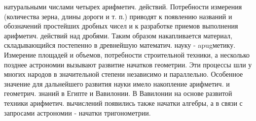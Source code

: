 \documentclass[10pt]{article}
\begin{document}
натуральными числами четырех арифметич. действий. Потребности измерения (количества зерна, длины дороги и т. п.) приводят к появлению названий и обозначений простейших дробных чисел и к разработке приемов выполнения арифметич. действий над дробями. Таким образом накапливается материал, складывающийся постепенно в древнейшую математич. науку - apugметику. Измерение площадей и объемов, потребности строительной техники, а несколько позднее астрономии вызывают развитие начатков геометрии. Эти процессы шли у многих народов в значительной степени независимо и параллельно. Особенное значение для дальнейшего развития науки имело накопление арифметич. и геометрич. знаний в Египте и Вавилонии. В Вавилонии на основе развитой техники арифметич. вычислений появились также начатки алгебры, а в связи с запросами астрономии - начатки тригонометрии.
\end{document}
